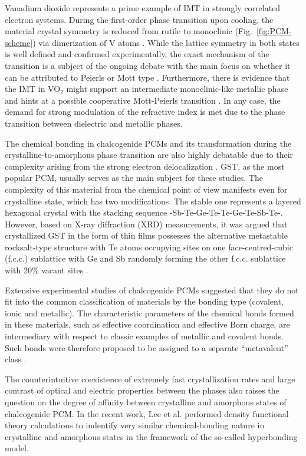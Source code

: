 \documentclass[journal=chreay,manuscript=review]{achemso}
\begin{document}
Vanadium dioxide represents a prime example of IMT in strongly correlated electron systems. During the first-order phase transition upon cooling, the material crystal symmetry is reduced from rutile to monoclinic (Fig.~\ref{fig:PCM-scheme}) via dimerization of V atoms \cite{kubler2007coherent}. While the lattice symmetry in both states is well defined and confirmed experimentally, the exact mechanism of the transition is a subject of the ongoing debate with the main focus on whether it can be attributed to Peierls or Mott type \cite{liu2018recent}.  Furthermore, there is evidence that the IMT in VO$_2$ might support an intermediate monoclinic-like metallic phase and hints at a possible cooperative Mott-Peierls transition \cite{yao2010understanding,vidas2020does,grandi2020unraveling}. In any case, the demand for strong modulation of the refractive index is met due to the phase transition between dielectric and metallic phases. 

The chemical bonding in chalcogenide PCMs and its transformation during the crystalline-to-amorphous phase transition are also highly debatable due to their complexity arising from the strong electron delocalization \cite{kolobov2004understanding, lee2020chemical}. GST, as the most popular PCM, usually serves as the main subject for these studies. The complexity of this material from the chemical point of view manifests even for crystalline state, which has two modifications. The stable one represents a layered hexagonal crystal with the stacking sequence -Sb-Te-Ge-Te-Te-Ge-Te-Sb-Te-. However, based on X-ray diffraction (XRD) measurements, it was argued that crystallized GST in the form of thin films possesses the alternative metastable rocksalt-type structure with Te atoms occupying sites on one face-centred-cubic (f.c.c.) sublattice with Ge and Sb randomly forming the other f.c.c. sublattice with 20$\%$ vacant sites \cite{yamada2000structure}. 

Extensive experimental studies of chalcogenide PCMs suggested that they do not fit into the common classification of materials by the bonding type (covalent, ionic and metallic). The characteristic parameters of the chemical bonds formed in these materials, such as effective coordination and effective Born charge, are intermediary with respect to classic examples of metallic and covalent bonds. Such bonds were therefore proposed to be assigned to a separate ``metavalent'' class \cite{zhu2018unique, wuttig2018incipient}.

The counterintuitive coexistence of extremely fast crystallization rates and large contrast of optical and electric properties between the phases also raises the question on the degree of affinity between crystalline and amorphous states of chalcogenide PCM. In the recent work, Lee et al. \cite{lee2020chemical} performed density functional theory calculations to indentify very similar chemical-bonding nature in crystalline and amorphous states in the framework of the so-called hyperbonding model.
\end{document}
